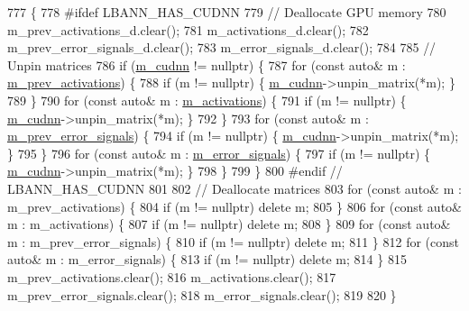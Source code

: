 \begin{DoxyCode}
777                                 \{
778 \textcolor{preprocessor}{#ifdef LBANN\_HAS\_CUDNN}
779   \textcolor{comment}{// Deallocate GPU memory}
780   m\_prev\_activations\_d.clear();
781   m\_activations\_d.clear();
782   m\_prev\_error\_signals\_d.clear();
783   m\_error\_signals\_d.clear();
784 
785   \textcolor{comment}{// Unpin matrices}
786   \textcolor{keywordflow}{if} (\hyperlink{classlbann_1_1Layer_a08dbb94239e3b8c96329786c57c72e21}{m\_cudnn} != \textcolor{keyword}{nullptr}) \{
787     \textcolor{keywordflow}{for} (\textcolor{keyword}{const} \textcolor{keyword}{auto}& m : \hyperlink{classlbann_1_1Layer_a52314601c3458268f56e017dc2ade357}{m\_prev\_activations}) \{
788       \textcolor{keywordflow}{if} (m != \textcolor{keyword}{nullptr}) \{ \hyperlink{classlbann_1_1Layer_a08dbb94239e3b8c96329786c57c72e21}{m\_cudnn}->unpin\_matrix(*m); \}
789     \}
790     \textcolor{keywordflow}{for} (\textcolor{keyword}{const} \textcolor{keyword}{auto}& m : \hyperlink{classlbann_1_1Layer_a7caf08e938141d1584e6939cefa4baed}{m\_activations}) \{
791       \textcolor{keywordflow}{if} (m != \textcolor{keyword}{nullptr}) \{ \hyperlink{classlbann_1_1Layer_a08dbb94239e3b8c96329786c57c72e21}{m\_cudnn}->unpin\_matrix(*m); \}
792     \}
793     \textcolor{keywordflow}{for} (\textcolor{keyword}{const} \textcolor{keyword}{auto}& m : \hyperlink{classlbann_1_1Layer_a6fdcbf884150d0b20cffe678fefd7caa}{m\_prev\_error\_signals}) \{
794       \textcolor{keywordflow}{if} (m != \textcolor{keyword}{nullptr}) \{ \hyperlink{classlbann_1_1Layer_a08dbb94239e3b8c96329786c57c72e21}{m\_cudnn}->unpin\_matrix(*m); \}
795     \}
796     \textcolor{keywordflow}{for} (\textcolor{keyword}{const} \textcolor{keyword}{auto}& m : \hyperlink{classlbann_1_1Layer_a452e22ac81c1a799f0614b3e942ea726}{m\_error\_signals}) \{
797       \textcolor{keywordflow}{if} (m != \textcolor{keyword}{nullptr}) \{ \hyperlink{classlbann_1_1Layer_a08dbb94239e3b8c96329786c57c72e21}{m\_cudnn}->unpin\_matrix(*m); \}
798     \}
799   \}
800 \textcolor{preprocessor}{#endif // LBANN\_HAS\_CUDNN}
801 
802   \textcolor{comment}{// Deallocate matrices}
803   \textcolor{keywordflow}{for} (\textcolor{keyword}{const} \textcolor{keyword}{auto}& m : m\_prev\_activations) \{
804     \textcolor{keywordflow}{if} (m != \textcolor{keyword}{nullptr}) \textcolor{keyword}{delete} m;
805   \}
806   \textcolor{keywordflow}{for} (\textcolor{keyword}{const} \textcolor{keyword}{auto}& m : m\_activations) \{
807     \textcolor{keywordflow}{if} (m != \textcolor{keyword}{nullptr}) \textcolor{keyword}{delete} m;
808   \}
809   \textcolor{keywordflow}{for} (\textcolor{keyword}{const} \textcolor{keyword}{auto}& m : m\_prev\_error\_signals) \{
810     \textcolor{keywordflow}{if} (m != \textcolor{keyword}{nullptr}) \textcolor{keyword}{delete} m;
811   \}
812   \textcolor{keywordflow}{for} (\textcolor{keyword}{const} \textcolor{keyword}{auto}& m : m\_error\_signals) \{
813     \textcolor{keywordflow}{if} (m != \textcolor{keyword}{nullptr}) \textcolor{keyword}{delete} m;
814   \}
815   m\_prev\_activations.clear();
816   m\_activations.clear();
817   m\_prev\_error\_signals.clear();
818   m\_error\_signals.clear();
819 
820 \}
\end{DoxyCode}
